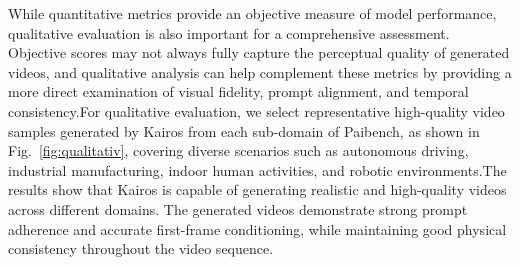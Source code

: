 \begin{table}[h]
\centering
\caption{Evaluation on PAI-bench. For each column, the highest score is \textbf{bolded}. }
\label{tab:paibench}
\end{table}





While quantitative metrics provide an objective measure of model performance, qualitative evaluation is also important for a comprehensive assessment. Objective scores may not always fully capture the perceptual quality of generated videos, and qualitative analysis can help complement these metrics by providing a more direct examination of visual fidelity, prompt alignment, and temporal consistency.For qualitative evaluation, we select representative high-quality video samples generated by Kairos from each sub-domain of Paibench, as shown in Fig.~\ref{fig:qualitativ}, covering diverse scenarios such as autonomous driving, industrial manufacturing, indoor human activities, and robotic environments.The results show that Kairos is capable of generating realistic and high-quality videos across different domains. The generated videos demonstrate strong prompt adherence and accurate first-frame conditioning, while maintaining good physical consistency throughout the video sequence.



